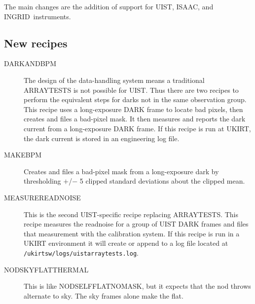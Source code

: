\documentclass[twoside,11pt]{article}
\newcommand{\htmladdnormallink}[2]{#1}
\newcommand{\htmlref}[2]{#1}
\renewcommand{\_}{\texttt{\symbol{95}}}
\newcommand{\UKIRT}{\htmladdnormallink{UKIRT}{http://www.jach.hawaii.edu/JACpublic/UKIRT/}}
\newcommand{\INGRID}{\htmladdnormallink{INGRID}{http://www.ing.iac.es/Astronomy/instruments/ingrid/}}
\newcommand{\ISAAC}{\htmladdnormallink{ISAAC}{http://www.eso.org/instruments/isaac/}}
\newcommand{\UIST}{\htmladdnormallink{UIST}{http://www.jach.hawaii.edu/JACpublic/UKIRT/instruments/uist/uist.html}}
\begin{document}
The main changes are the addition of support for \UIST, \ISAAC, and
\INGRID\ instruments.

\subsection{New recipes}
\begin{description}
  \item [\htmlref{DARK\_AND\_BPM}{DARK\_AND\_BPM}]
    The design of the data-handling system means a traditional
    ARRAY\_TESTS is not possible for \UIST.  Thus there are two recipes
    to perform the equivalent steps for darks not in the same
    observation group.  This recipe uses a long-exposure DARK frame to 
    locate bad pixels, then creates and files a bad-pixel mask.  It
    then measures and reports the dark current from a long-exposure DARK
    frame.  If this recipe is run at \UKIRT, the dark current is stored in
    an engineering log file.
  \item [\htmlref{MAKE\_BPM}{MAKE\_BPM}]
    Creates and files a bad-pixel mask from a long-exposure dark by
    thresholding $+$/$-$ 5 clipped standard deviations about the clipped
    mean.
  \item [\htmlref{MEASURE\_READNOISE}{MEASURE\_READNOISE}]
    This is the second UIST-specific recipe replacing ARRAY\_TESTS.
    This recipe measures the readnoise for a group of UIST DARK frames
    and files that measurement with the calibration system.  If this recipe 
    is run in a UKIRT environment it will create or append to a log file
    located at {\tt/ukirt\_sw/logs/uist\_array\_tests.log}.
  \item [\htmlref{NOD\_SKY\_FLAT\_THERMAL}{NOD\_SKY\_FLAT\_THERMAL}]
    This is like \htmlref{NOD\_SELF\_FLAT\_NO\_MASK}{NOD\_SELF\_FLAT\_NO\_MASK},
    but it expects that the nod throws alternate to sky.  The sky frames
    alone make the flat.
\end{description}
\end{document}
